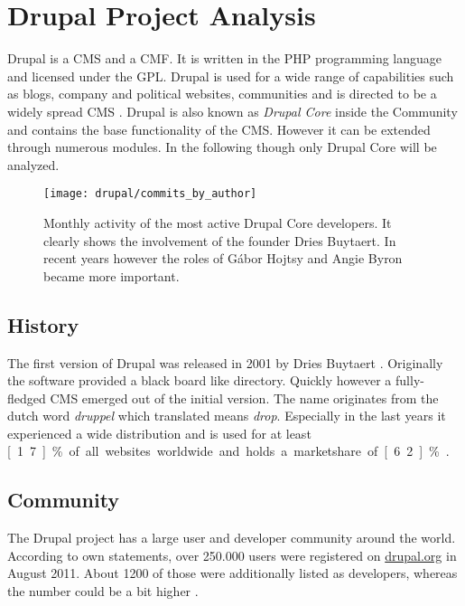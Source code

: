 \section{Drupal Project Analysis} %


Drupal is a \ac{CMS} and a \ac{CMF}. It is written in the PHP programming
language and licensed under the \ac{GPL}. Drupal is used for a wide range of
capabilities such as blogs, company and political websites, communities and is
directed to be a widely spread \ac{CMS} \cite{DrupalOverview}. Drupal is also
known as \emph{Drupal Core} inside the Community and contains the base
functionality of the \ac{CMS}. However it can be extended through numerous
modules. In the following though only Drupal Core will be analyzed.

\begin{figure}[htbp]
  \centering
  \texttt{[image: drupal/commits\_by\_author]}
  \caption[Commits by most active authors, Drupal]
  {Monthly activity of the most active Drupal Core developers. It clearly shows
    the involvement of the founder Dries Buytaert. In recent years however the
    roles of Gábor Hojtsy and Angie Byron became more important.}
\end{figure}

\subsection{History} %

The first version of Drupal was released in 2001 by Dries Buytaert
\cite{DrupalHistory}. Originally the software provided a black board like
directory. Quickly however a fully-fledged \ac{CMS} emerged out of the initial
version. The name originates from the dutch word \emph{druppel} which
translated means \emph{drop}. Especially in the last years it
experienced a wide distribution and is used for at least \unit[1.7]{\%} of all
websites worldwide and holds a marketshare of \unit[6.2]{\%}
\cite{DrupalBuiltWith,DrupalW3Techs}.


\subsection{Community} %

The Drupal project has a large user and developer community around the world.
According to own statements, over 250.000 users were registered on
\url{drupal.org} in August 2011. About 1200 of those were additionally listed
as developers, whereas the number could be a bit higher \cite{DrupalBuytaert}.

